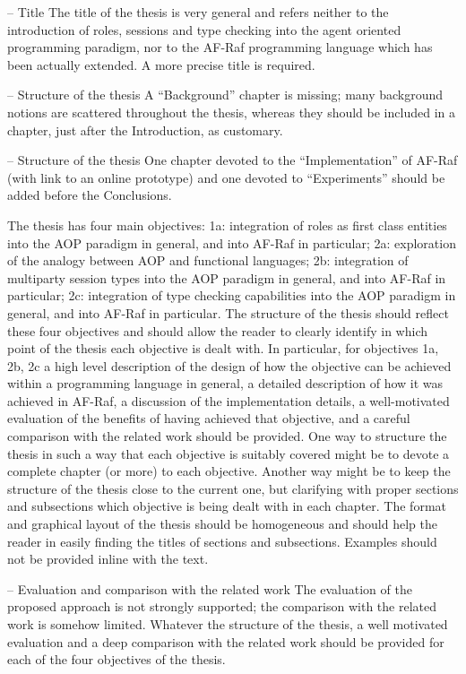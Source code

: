 \documentclass{article}
\newenvironment{them}{\noindent\begingroup\color{blue}}{\endgroup\par}
\begin{document}
\end{them}
\begin{them}

\begin{them}
-- Title
The title of the thesis is very general and refers neither to the introduction of roles, sessions and type checking into the agent oriented programming paradigm, nor to the AF-Raf programming language which has been actually extended. A more precise title is required.
\end{them}


\begin{them}
-- Structure of the thesis
A “Background” chapter is missing; many background notions are scattered throughout the thesis, whereas they should be included in a chapter, just after the Introduction, as customary.
\end{them}

\begin{them}
-- Structure of the thesis
One chapter devoted to the “Implementation” of AF-Raf (with link to an online prototype) and one
devoted to “Experiments” should be added before the Conclusions.
\end{them}

\begin{them}
The thesis has four main objectives: 1a: integration of roles as first class entities into the AOP paradigm in general, and into AF-Raf in particular; 2a: exploration of the analogy between AOP and functional languages; 2b: integration of multiparty session types into the AOP paradigm in general, and into AF-Raf in particular; 2c: integration of type checking capabilities into the AOP paradigm in general, and into AF-Raf in particular.
The structure of the thesis should reflect these four objectives and should allow the reader to clearly identify in which point of the thesis each objective is dealt with. In particular, for objectives 1a, 2b, 2c a high level description of the design of how the objective can be achieved within a programming language in general, a detailed description of how it was achieved in AF-Raf, a discussion of the implementation details, a well-motivated evaluation of the benefits of having achieved that objective, and a careful comparison with the related work should be provided.
One way to structure the thesis in such a way that each objective is suitably covered might be to
devote a complete chapter (or more) to each objective. Another way might be to keep the structure
of the thesis close to the current one, but clarifying with proper sections and subsections which
objective is being dealt with in each chapter.
The format and graphical layout of the thesis should be homogeneous and should help the reader in
easily finding the titles of sections and subsections. Examples should not be provided inline with the text.
\end{them}
\begin{them}
-- Evaluation and comparison with the related work
The evaluation of the proposed approach is not strongly supported; the comparison with the related work is somehow limited. Whatever the structure of the thesis, a well motivated evaluation and a deep comparison with the related work should be provided for each of the four objectives of the
thesis.


\end{them}
\end{them}
\end{document}
